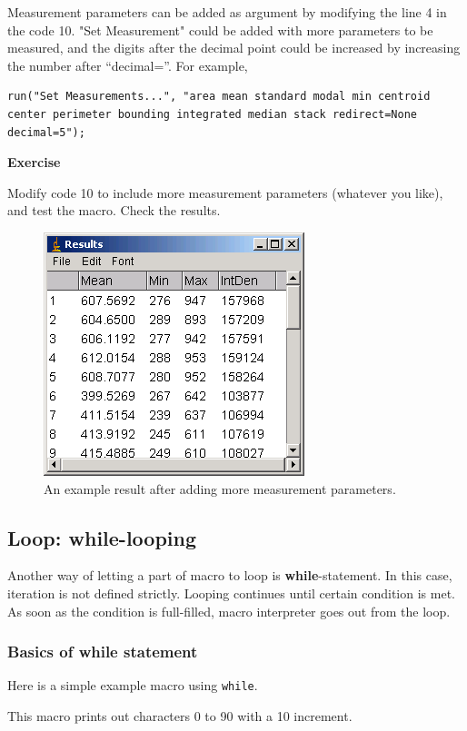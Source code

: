 \documentclass[11pt,a4paper,oneside]{report}
\newenvironment{indentexercise}[1]%
{{\setlength{\leftmargin}{2em}}%
\textbf{Exercise \thesubsection-#1}%
\begin{list}{}%
	\item%
}
{\end{list}}
\newcommand{\ilcom}[1]{\texttt{\small#1}}
\begin{document}
Measurement parameters can be added as argument by modifying the line 4 in the code 10. "Set Measurement" could be added with more parameters to be measured, and the digits after the decimal point could be increased by increasing the number after ``decimal=''. For example, 
\begin{lstlisting}[numbers=none]
run("Set Measurements...", "area mean standard modal min centroid center perimeter bounding integrated median stack redirect=None decimal=5");
\end{lstlisting}

\begin{indentexercise}{1}
Modify code 10 to include more measurement parameters (whatever you like), and test the macro. Check the results. 
\end{indentexercise}

\begin{figure}[htbp]
\begin{center}
\includegraphics[scale=0.5]{fig/fig2322_moreResultsTable.png}
\caption{An example result after adding more measurement parameters.}
\label{fig_MoreMeasurementPara}
\end{center}
\end{figure} 

\subsection{Loop: while-looping}

Another way of letting a part of macro to loop is \textbf{while}-statement. In this case, iteration is not defined strictly. Looping continues until certain condition is met. As soon as the condition is full-filled, macro interpreter goes out from the loop.

\subsubsection{Basics of while statement}
Here is a simple example macro using \ilcom{while}.

This macro prints out characters 0 to 90 with a 10 increment. 
\end{document}
